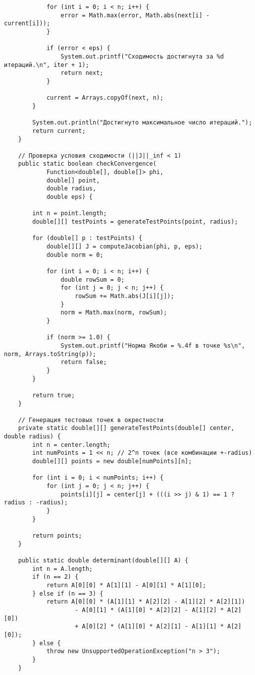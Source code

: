 \begin{verbatim}
            for (int i = 0; i < n; i++) {
                error = Math.max(error, Math.abs(next[i] - current[i]));
            }

            if (error < eps) {
                System.out.printf("Сходимость достигнута за %d итераций.\n", iter + 1);
                return next;
            }

            current = Arrays.copyOf(next, n);
        }

        System.out.println("Достигнуто максимальное число итераций.");
        return current;
    }

    // Проверка условия сходимости (||J||_inf < 1)
    public static boolean checkConvergence(
            Function<double[], double[]> phi,
            double[] point,
            double radius,
            double eps) {

        int n = point.length;
        double[][] testPoints = generateTestPoints(point, radius);

        for (double[] p : testPoints) {
            double[][] J = computeJacobian(phi, p, eps);
            double norm = 0;

            for (int i = 0; i < n; i++) {
                double rowSum = 0;
                for (int j = 0; j < n; j++) {
                    rowSum += Math.abs(J[i][j]);
                }
                norm = Math.max(norm, rowSum);
            }

            if (norm >= 1.0) {
                System.out.printf("Норма Якоби = %.4f в точке %s\n", norm, Arrays.toString(p));
                return false;
            }
        }

        return true;
    }

    // Генерация тестовых точек в окрестности
    private static double[][] generateTestPoints(double[] center, double radius) {
        int n = center.length;
        int numPoints = 1 << n; // 2^n точек (все комбинации +-radius)
        double[][] points = new double[numPoints][n];

        for (int i = 0; i < numPoints; i++) {
            for (int j = 0; j < n; j++) {
                points[i][j] = center[j] + (((i >> j) & 1) == 1 ? radius : -radius);
            }
        }

        return points;
    }

    public static double determinant(double[][] A) {
        int n = A.length;
        if (n == 2) {
            return A[0][0] * A[1][1] - A[0][1] * A[1][0];
        } else if (n == 3) {
            return A[0][0] * (A[1][1] * A[2][2] - A[1][2] * A[2][1])
                    - A[0][1] * (A[1][0] * A[2][2] - A[1][2] * A[2][0])
                    + A[0][2] * (A[1][0] * A[2][1] - A[1][1] * A[2][0]);
        } else {
            throw new UnsupportedOperationException("n > 3");
        }
    }


\end{verbatim}
